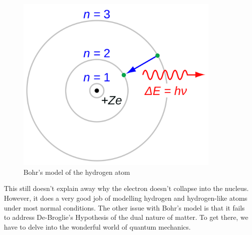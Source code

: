 \begin{figure}[H]
  \centering
  \includegraphics[width=100mm]{figures/bohr.png}
  \caption{Bohr's model of the hydrogen atom\cite{Bohr_model}}
  \label{bohr}
\end{figure}

This still doesn't explain away why the electron doesn't collapse into the nucleus.
However, it does a very good job of modelling hydrogen and hydrogen-like atoms under most normal conditions.
The other issue with Bohr's model is that it fails to address De-Broglie’s Hypothesis of the dual nature of matter.
To get there, we have to delve into the wonderful world of quantum mechanics.
